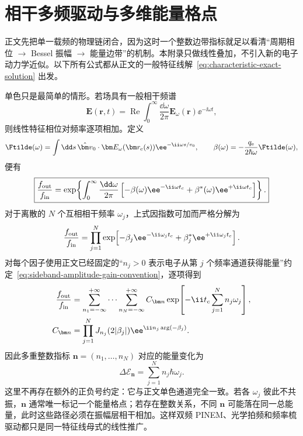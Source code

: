 \chapter{相干多频驱动与多维能量格点}
\label{app:multifrequency-chapter}

\label{app:multifrequency-coherent}

正文先把单一载频的物理链闭合，因为这时一个整数边带指标就足以看清“周期相位 $\to$ Bessel 振幅 $\to$ 能量边带”的机制。本附录只做线性叠加，不引入新的电子动力学近似。以下所有公式都从正文的一般特征线解~\eqref{eq:characteristic-exact-solution} 出发。

单色只是最简单的情形。若场具有一般相干频谱
\begin{equation}
 \bm E(\bm r,t)
 =\operatorname{Re}\int_0^\infty\frac{\dd\omega}{2\pi}
 \bm E_\omega(\bm r)\ee^{-\ii\omega t},
 \label{eq:general-coherent-spectrum}
\end{equation}
则线性特征相位对频率逐项相加。定义
\begin{equation}
 \Ftilde(\omega)
 =\int\dd s\,
 \hat{\bm v}_0\cdot\bm E_\omega(\bm r_{\rm e}(s))
 \ee^{-\ii\omega s/v_0},
 \qquad
 \beta(\omega)=-\frac{q_{\rm e}}{2\hbar\omega}\Ftilde(\omega),
\end{equation}
便有
\begin{equation}
 \boxed{
 \frac{f_{\rm out}}{f_{\rm in}}
 =\exp\!\left\{
 \int_0^\infty\frac{\dd\omega}{2\pi}
 \left[-\beta(\omega)\ee^{-\ii\omega t_c}
 +\beta^*(\omega)\ee^{+\ii\omega t_c}\right]
 \right\}.}
 \label{eq:multifrequency-eikonal}
\end{equation}
对于离散的 $N$ 个互相相干频率 $\omega_j$，上式因指数可加而严格分解为
\begin{equation}
 \frac{f_{\rm out}}{f_{\rm in}}
 =\prod_{j=1}^{N}
 \exp\!\left[-\beta_j\ee^{-\ii\omega_jt_c}
 +\beta_j^*\ee^{+\ii\omega_jt_c}\right].
 \label{eq:multicolor-product}
\end{equation}
对每个因子使用正文已经固定的“$n_j>0$ 表示电子从第 $j$ 个频率通道获得能量”约定~\eqref{eq:sideband-amplitude-gain-convention}，逐项得到
\begin{align}
\frac{f_{\rm out}}{f_{\rm in}}
&=\sum_{n_1=-\infty}^{+\infty}\cdots
\sum_{n_N=-\infty}^{+\infty}
C_{\bm n}
\exp\!\left[-\ii t_c\sum_{j=1}^Nn_j\omega_j\right],\\
C_{\bm n}
&=\prod_{j=1}^{N}
J_{n_j}(2|\beta_j|)
\ee^{\ii n_j\arg(-\beta_j)}.
\label{eq:multicolor-amplitude-product}
\end{align}
因此多重整数指标 $\bm n=(n_1,\ldots,n_N)$ 对应的能量变化为
\begin{equation}
\boxed{
 \Delta\mathcal E_{\bm n}
 =\sum_{j=1}^N n_j\hbar\omega_j.}
 \label{eq:multicolor-energy-lattice}
\end{equation}
这里不再存在额外的正负号约定：它与正文单色通道完全一致。若各 $\omega_j$ 彼此不共振，$\bm n$ 通常唯一标记一个能量格点；若存在整数关系，不同 $\bm n$ 可能落在同一总能量，此时这些路径必须在振幅层相干相加。这样双频 PINEM、光学拍频和频率梳驱动都只是同一特征线母式的线性推广。
